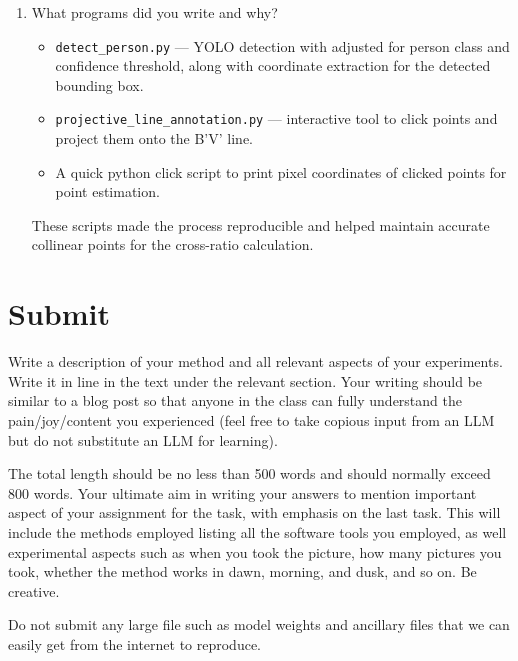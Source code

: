 \begin{enumerate}
\item What programs did you write and why?  
\begin{studentSpace}
    \begin{itemize}
        \item \texttt{detect\_person.py} — YOLO detection with adjusted for person class and confidence threshold, along with coordinate extraction for the detected bounding box.
        \item \texttt{projective\_line\_annotation.py} — interactive tool to click points and project them onto the B'V' line.
        \item A quick python click script to print pixel coordinates of clicked points for point estimation.
\end{itemize}
These scripts made the process reproducible and helped maintain accurate collinear points for the cross-ratio calculation.
\end{studentSpace}


\end{enumerate}

\section{Submit}

Write a description of your method and all relevant aspects of your
experiments. Write it in line in the text under the relevant section.  Your writing should be similar to  a blog post so that anyone in the class can fully understand the pain/joy/content you experienced (feel free to take copious input from an LLM but do not substitute an LLM for learning).

The total length should be no less than 500 words and
should normally exceed 800 words.  Your ultimate aim in writing your answers
to mention important aspect of your assignment for the task, with
emphasis on the last task.  This will include the methods employed
listing all the software tools you employed, as well experimental
aspects such as when you took the picture, how many pictures 
you took, whether the method works in dawn, morning, and dusk, and so
on. Be creative.  

Do not submit any large file such as
model weights and ancillary files that we can easily get from the
internet to reproduce.
